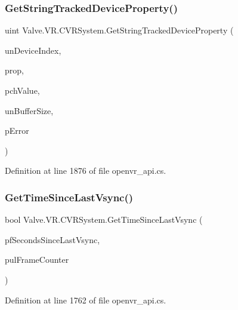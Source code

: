 \subsubsection{\texorpdfstring{GetStringTrackedDeviceProperty()}{GetStringTrackedDeviceProperty()}}
{\footnotesize\ttfamily uint Valve.\+V\+R.\+C\+V\+R\+System.\+Get\+String\+Tracked\+Device\+Property (\begin{DoxyParamCaption}\item[{uint}]{un\+Device\+Index,  }\item[{\mbox{\hyperlink{namespace_valve_1_1_v_r_ab060521ead7273986988fc4897e52482}{E\+Tracked\+Device\+Property}}}]{prop,  }\item[{System.\+Text.\+String\+Builder}]{pch\+Value,  }\item[{uint}]{un\+Buffer\+Size,  }\item[{ref \mbox{\hyperlink{namespace_valve_1_1_v_r_aab6684f03930a2d2cf22ed66b437e47b}{E\+Tracked\+Property\+Error}}}]{p\+Error }\end{DoxyParamCaption})}



Definition at line 1876 of file openvr\+\_\+api.\+cs.

\mbox{\label{class_valve_1_1_v_r_1_1_c_v_r_system_afd1fefe2c93366053820330d68303ad7}} 
\subsubsection{\texorpdfstring{GetTimeSinceLastVsync()}{GetTimeSinceLastVsync()}}
{\footnotesize\ttfamily bool Valve.\+V\+R.\+C\+V\+R\+System.\+Get\+Time\+Since\+Last\+Vsync (\begin{DoxyParamCaption}\item[{ref float}]{pf\+Seconds\+Since\+Last\+Vsync,  }\item[{ref ulong}]{pul\+Frame\+Counter }\end{DoxyParamCaption})}



Definition at line 1762 of file openvr\+\_\+api.\+cs.

\mbox{\label{class_valve_1_1_v_r_1_1_c_v_r_system_a0daef57d1ec6478a14450cb05febca59}} 
